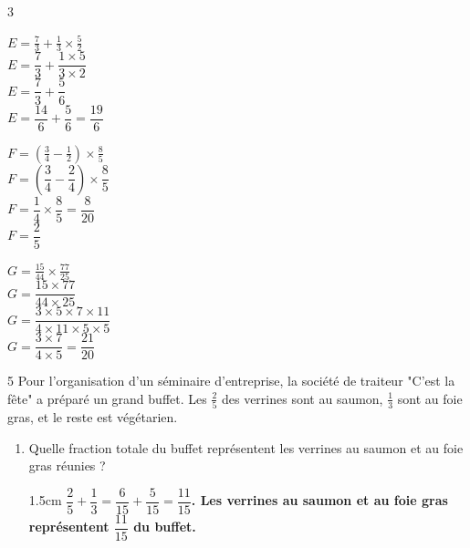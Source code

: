 \documentclass[a4paper]{book}
\begin{document}
{\begin{exerciceNote}{3}
        \vspace{0.8cm}
        \begin{minipage}[t]{0.31\textwidth}
            $E = \frac{7}{3} + \frac{1}{3} \times \frac{5}{2}$ \\
            \color{red}\bfseries
            $E = \dfrac{7}{3} + \dfrac{1 \times 5}{3 \times 2}$ \\
            $E = \dfrac{7}{3} + \dfrac{5}{6}$ \\
            $E = \dfrac{14}{6} + \dfrac{5}{6} = \dfrac{19}{6}$
            \vspace{1.5cm}
        \end{minipage}\hfill \vline \hfill
        \begin{minipage}[t]{0.31\textwidth}
            $F = \left( \frac{3}{4} - \frac{1}{2} \right) \times \frac{8}{5}$ \\
            \color{red}\bfseries
            $F = \left( \dfrac{3}{4} - \dfrac{2}{4} \right) \times \dfrac{8}{5}$ \\
            $F = \dfrac{1}{4} \times \dfrac{8}{5} = \dfrac{8}{20}$ \\
            $F = \dfrac{2}{5}$
            \vspace{1.5cm}
        \end{minipage}\hfill \vline \hfill
        \begin{minipage}[t]{0.31\textwidth}
            $G = \frac{15}{44} \times \frac{77}{25}$ \\
            \color{red}\bfseries
            $G = \dfrac{15 \times 77}{44 \times 25}$ \\
            $G = \dfrac{3 \times 5 \times 7 \times 11}{4 \times 11 \times 5 \times 5}$ \\
            $G = \dfrac{3 \times 7}{4 \times 5} = \dfrac{21}{20}$
            \vspace{1.5cm}
        \end{minipage}
        \vspace{0.5cm}
    \end{exerciceNote}
    
    \begin{exerciceNote}{5}       
        Pour l'organisation d'un séminaire d'entreprise, la société de traiteur "C'est la fête" a préparé un grand buffet. Les $\frac{2}{5}$ des verrines sont au saumon, $\frac{1}{3}$ sont au foie gras, et le reste est végétarien.
        \begin{enumerate}
            \item Quelle fraction totale du buffet représentent les verrines au saumon et au foie gras réunies ?
            \begin{ZoneReponse}{1.5cm}
                \color{red}\bfseries
                $\dfrac{2}{5} + \dfrac{1}{3} = \dfrac{6}{15} + \dfrac{5}{15} = \dfrac{11}{15}$. Les verrines au saumon et au foie gras représentent $\dfrac{11}{15}$ du buffet.
            \end{ZoneReponse}
            

\end{enumerate}
\end{exerciceNote}}
\end{document}
